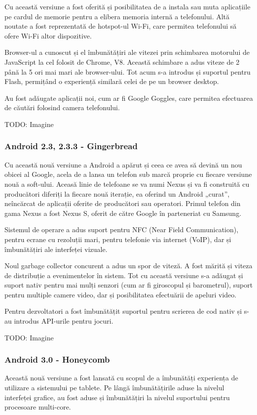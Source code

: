 \documentclass[12pt,a4paper]{article}
\begin{document}
	Cu această versiune a fost oferită și posibilitatea de a instala sau muta aplicațiile pe cardul de memorie pentru a elibera memoria internă a telefonului. Altă noutate a fost reprezentată de hotspot-ul Wi-Fi, care permitea telefonului să ofere Wi-Fi altor dispozitive.

	Browser-ul a cunoscut și el îmbunătățiri ale vitezei prin schimbarea motorului de JavaScript la cel folosit de Chrome, V8. Această schimbare a adus viteze de 2 până la 5 ori mai mari ale browser-ului. Tot acum s-a introdus și suportul pentru Flash, permițând o experiență similară celei de pe un browser desktop.

	Au fost adăugate aplicații noi, cum ar fi Google Goggles, care permitea efectuarea de căutări folosind camera telefonului.

	TODO: Imagine

\subsubsection{Android 2.3, 2.3.3 - Gingerbread}
Cu această nouă versiune a Android a apărut și ceea ce avea să devină un nou obicei al Google, acela de a lansa un telefon sub marcă proprie cu fiecare versiune nouă a soft-ului. Aceasă linie de telefoane se va numi Nexus și va fi construită cu producători diferiți la fiecare nouă iterație, ea oferind un Android „curat”, neîncărcat de aplicații oferite de producători sau operatori. Primul telefon din gama Nexus a fost Nexus S, oferit de către Google în parteneriat cu Samsung.

	Sistemul de operare a adus suport pentru NFC (Near Field Communication), pentru ecrane cu rezoluții mari, pentru telefonie via internet (VoIP), dar și îmbunătățiri ale interfeței vizuale.

	Noul garbage collector concurent a adus un spor de viteză. A fost mărită și viteza de distribuție a evenimentelor în sistem. Tot cu această versiune s-a adăugat și suport nativ pentru mai mulți senzori (cum ar fi giroscopul și barometrul), suport pentru multiple camere video, dar și posibilitatea efectuării de apeluri video.

	Pentru dezvoltatori a fost îmbunătățit suportul pentru scrierea de cod nativ și s-au introdus API-urile pentru jocuri.

	TODO: Imagine

\subsubsection{Android 3.0 - Honeycomb}
Această nouă versiune a fost lansată cu scopul de a îmbunătăți experiența de utilizare a sistemului pe tablete. Pe lângă îmbunătățirile aduse la nivelul interfeței grafice, au fost aduse și îmbunătățiri la nivelul suportului pentru procesoare multi-core.
\end{document}
